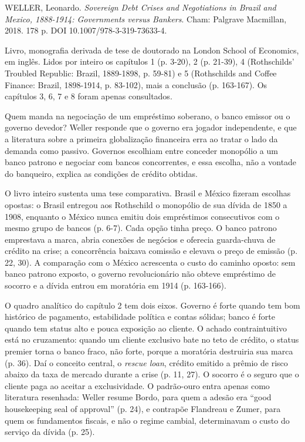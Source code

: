 
\begin{identificacao}
WELLER, Leonardo. \textit{Sovereign Debt Crises and Negotiations in Brazil and
Mexico, 1888-1914: Governments versus Bankers}. Cham: Palgrave Macmillan, 2018.
178 p. DOI 10.1007/978-3-319-73633-4.

Livro, monografia derivada de tese de doutorado na London School of Economics,
em inglês. Lidos por inteiro os capítulos 1 (p. 3-20), 2 (p. 21-39), 4
(Rothschilds' Troubled Republic: Brazil, 1889-1898, p. 59-81) e 5 (Rothschilds
and Coffee Finance: Brazil, 1898-1914, p. 83-102), mais a conclusão (p. 163-167).
Os capítulos 3, 6, 7 e 8 foram apenas consultados.
\end{identificacao}


Quem manda na negociação de um empréstimo soberano, o banco emissor ou o governo
devedor? Weller responde que o governo era jogador independente, e que a
literatura sobre a primeira globalização financeira erra ao tratar o lado da
demanda como passivo. Governos escolhiam entre conceder monopólio a um banco
patrono e negociar com bancos concorrentes, e essa escolha, não a vontade do
banqueiro, explica as condições de crédito obtidas.


O livro inteiro sustenta uma tese comparativa. Brasil e México fizeram escolhas
opostas: o Brasil entregou aos Rothschild o monopólio de sua dívida de 1850 a
1908, enquanto o México nunca emitiu dois empréstimos consecutivos com o mesmo
grupo de bancos (p. 6-7). Cada opção tinha preço. O banco patrono emprestava a
marca, abria conexões de negócios e oferecia guarda-chuva de crédito na crise; a
concorrência baixava comissão e elevava o preço de emissão (p. 22, 30). A
comparação com o México acrescenta o custo do caminho oposto: sem banco patrono
exposto, o governo revolucionário não obteve empréstimo de socorro e a dívida
entrou em moratória em 1914 (p. 163-166).

O quadro analítico do capítulo 2 tem dois eixos. Governo é forte quando tem bom
histórico de pagamento, estabilidade política e contas sólidas; banco é forte
quando tem status alto e pouca exposição ao cliente. O achado contraintuitivo
está no cruzamento: quando um cliente exclusivo bate no teto de crédito, o status
premier torna o banco fraco, não forte, porque a moratória destruiria sua marca
(p. 36). Daí o conceito central, o \textit{rescue loan}, crédito emitido a prêmio
de risco abaixo da taxa de mercado durante a crise (p. 11, 27). O socorro é o
seguro que o cliente paga ao aceitar a exclusividade. O padrão-ouro entra apenas
como literatura resenhada: Weller resume Bordo, para quem a adesão era ``good
housekeeping seal of approval'' (p. 24), e contrapõe Flandreau e Zumer, para quem
os fundamentos fiscais, e não o regime cambial, determinavam o custo do serviço
da dívida (p. 25).

